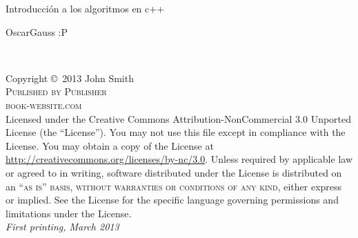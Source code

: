 \documentclass[11pt,fleqn]{book} %
\renewcommand{\chaptername}{Lecture}
\begin{document}
\renewcommand{\chaptername}{Capítulo}%

\begingroup
\thispagestyle{empty}
\centering
\vspace*{9cm}
\par\normalfont\fontsize{35}{35}\sffamily\selectfont
Introducción a los algoritmos en c++\par %
\vspace*{1cm}
{\Huge OscarGauss :P}\par %
\endgroup


\newpage
~\vfill
\thispagestyle{empty}

\noindent Copyright \copyright\ 2013 John Smith\\ %

\noindent \textsc{Published by Publisher}\\ %

\noindent \textsc{book-website.com}\\ %

\noindent Licensed under the Creative Commons Attribution-NonCommercial 3.0 Unported License (the ``License''). You may not use this file except in compliance with the License. You may obtain a copy of the License at \url{http://creativecommons.org/licenses/by-nc/3.0}. Unless required by applicable law or agreed to in writing, software distributed under the License is distributed on an \textsc{``as is'' basis, without warranties or conditions of any kind}, either express or implied. See the License for the specific language governing permissions and limitations under the License.\\ %

\noindent \textit{First printing, March 2013} %

\end{document}
